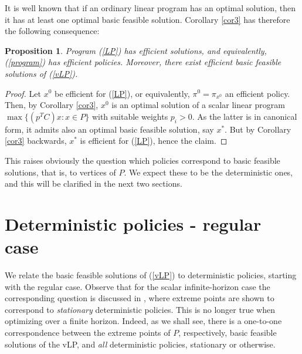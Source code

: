 \documentclass{article}
\newtheorem{proposition}[theorem]{Proposition}
\theoremstyle{definition}
\numberwithin{equation}{section}
\begin{document}
It is well known that if an ordinary linear program has an optimal solution, then it has at least one optimal basic feasible solution. Corollary \ref{cor3} has therefore the following consequence: %

\begin{proposition}
\label{prop5}
Program {\rm (\ref{LP})} has efficient solutions, and equivalently, {\rm (\ref{program})} has  efficient policies. Moreover, there exist efficient
basic feasible solutions of {\rm (\ref{vLP})}.
\end{proposition}


\begin{proof}
Let $x^0$ be efficient for (\ref{LP}), or equivalently, $\pi^0=\pi_{x^0}$ an efficient policy. Then, by Corollary \ref{cor3}, $x^0$ is an optimal solution
of a scalar linear program   $\max\{(p^{T}C)x: x \in P\}$ with suitable weights $p_i > 0$. 
As the latter is in canonical form, it
admits also an optimal basic feasible solution, say $x^*$. But by Corollary \ref{cor3} backwards, $x^*$ is 
efficient for (\ref{LP}), hence
the claim.
\end{proof}

 
This raises obviously the question  which  policies correspond to basic feasible solutions, that is, to vertices of $P$. We expect these to be the deterministic ones,  
and this will be clarified in the next two sections.
\\

\section{Deterministic policies -  regular case}
\label{sect_regular_case}



We relate the basic feasible solutions of (\ref{vLP}) %
to deterministic policies, starting with the regular case. 
Observe that for the scalar infinite-horizon case the corresponding question is discussed in
\cite[p. 245]{16}, where  
extreme points are shown to correspond to {\it stationary} deterministic policies. 
This is no longer true when optimizing over a finite horizon. Indeed, as we shall see, there is a one-to-one correspondence between the extreme points of $P$, respectively,
basic feasible solutions of the vLP, and {\it all} deterministic policies, stationary or otherwise.
\end{document}
